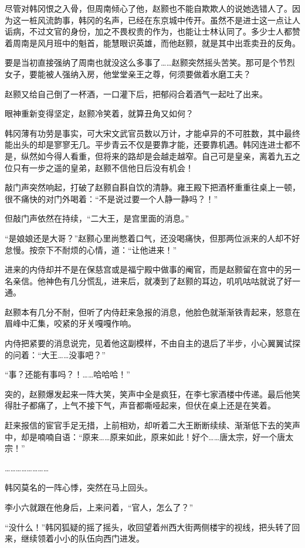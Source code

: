 尽管对韩冈恨之入骨，但周南倾心了他，赵颢也不能自欺欺人的说她选错人了。因为这一桩风流韵事，韩冈的名声，已经在东京城中传开。虽然不是进士这一点让人诟病，不过文官的身份，加之不畏权贵的作为，也能让士林认同了。多少士人都赞着周南是风月班中的魁首，能慧眼识英雄，而他赵颢，就是其中出乖卖丑的反角。

要是当初直接强纳了周南也就没这么多事了……赵颢突然摇头苦笑。那可是个节烈女子，要能被人强纳入房，他堂堂亲王之尊，何须要做着水磨工夫？

赵颢又给自己倒了一杯酒，一口灌下后，把郁闷合着酒气一起吐了出来。

眼神重新变得坚定，赵颢冷笑着，就算丑角又如何？

韩冈薄有功劳是事实，可大宋文武官员数以万计，才能卓异的不可胜数，其中最终能出头的却是寥寥无几。平步青云不仅是要靠才能，还要靠机遇。韩冈连进士都不是，纵然如今得人看重，但将来的路却是会越走越窄。自己可是皇亲，离着九五之位只有一步之遥的皇弟，赵颢不信他日后没有机会！

敲门声突然响起，打破了赵颢自斟自饮的清静。雍王殿下把酒杯重重往桌上一顿，很不痛快的对门外喝着：“不是说过要一个人静一静吗？！”

但敲门声依然在持续，“二大王，是宫里面的消息。”

“是娘娘还是大哥？”赵颢心里尚憋着口气，还没喝痛快，但那两位派来的人却不好怠慢。按奈下不耐烦的心情，道：“让他进来！”

进来的内侍却并不是在保慈宫或是福宁殿中做事的阉官，而是赵颢留在宫中的另一名亲信。他神色有几分慌乱，进来后，就凑到了赵颢的耳边，叽叽咕咕就说了好一通。

赵颢本有几分不耐，但听了内侍赶来急报的消息，他脸色就渐渐铁青起来，怒意在眉峰中汇集，咬紧的牙关嘎嘎作响。

内侍把紧要的消息说完，见着他这副模样，不由自主的退后了半步，小心翼翼试探的问着：“大王……没事吧？”

“事？还能有事吗？！……哈哈哈！”

突的，赵颢爆发起来一阵大笑，笑声中全是疯狂，在李七家酒楼中传递。最后他笑得肚子都痛了，上气不接下气，声音都嘶哑起来，但伏在桌上还是在笑着。

赶来报信的宦官手足无措，上前相劝，却听着二大王断断续续、渐渐低下去的笑声中，却是喃喃自语：“原来……原来如此，原来如此！好个……唐太宗，好一个唐太宗！”

……………………

韩冈莫名的一阵心悸，突然在马上回头。

李小六就跟在他身后，上来问着，“官人，怎么了？”

“没什么！”韩冈狐疑的摇了摇头，收回望着州西大街两侧楼宇的视线，把头转了回来，继续领着小小的队伍向西门进发。

